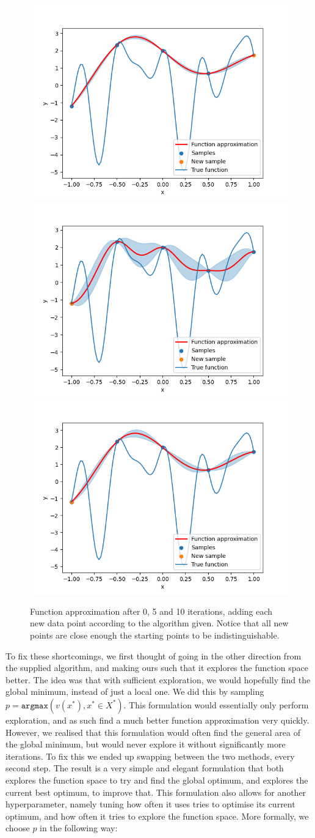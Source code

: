 \begin{figure}[h]
\centering
\includegraphics[width=0.3\linewidth]{images/bayesian_optimization_0.png}
\includegraphics[width=0.3\linewidth]{images/bayesian_optimization_4.png}
\includegraphics[width=0.3\linewidth]{images/bayesian_optimization_9.png}
\setlength{\belowcaptionskip}{-10pt}
\caption{Function approximation after 0, 5 and 10 iterations, adding each new data point according to the algorithm given. Notice that all new points are close enough the starting points to be indistinguishable.}
\label{fig:iter_naive}
\end{figure}

To fix these shortcomings, we first thought of going in the other direction from the supplied algorithm, and making ours such that it explores the function space better. The idea was that with sufficient exploration, we would hopefully find the global minimum, instead of just a local one. We did this by sampling $p = \texttt{argmax} \left( v(x^*), x^* \in X^*\right)$. This formulation would essentially only perform exploration, and as such find a much better function approximation very quickly. However, we realised that this formulation would often find the general area of the global minimum, but would never explore it without significantly more iterations. To fix this we ended up swapping between the two methods, every second step. The result is a very simple and elegant formulation that both explores the function space to try and find the global optimum, and explores the current best optimum, to improve that. This formulation also allows for another hyperparameter, namely tuning how often it uses tries to optimise its current optimum, and how often it tries to explore the function space. More formally, we choose $p$ in the following way:


